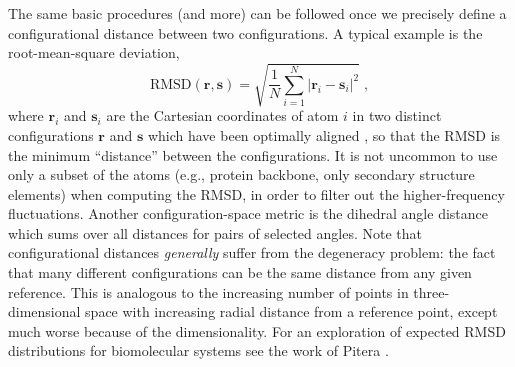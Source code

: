 The same basic procedures (and more) can be followed once we precisely define a configurational distance between two configurations.  A typical example is the root-mean-square deviation,
\begin{equation}
\label{eq:rmsd}
\mathrm{RMSD}(\mathbf{r}, \mathbf{s}) = \sqrt{\frac{1}{N}\sum_{i=1}^{N} \left| \mathbf{r}_i - \mathbf{s}_i \right|^2} \;,
\end{equation}
where $\mathbf{r}_i$ and $\mathbf{s}_i$ are the Cartesian coordinates of atom $i$ in two distinct configurations $\mathbf{r}$ and $\mathbf{s}$ which have been optimally aligned \cite{Kabsch1976}, so that the RMSD is the minimum ``distance'' between the configurations. 
It is not uncommon to use only a subset of the atoms (e.g., protein backbone, only secondary structure elements) when computing the RMSD, in order to filter out the higher-frequency fluctuations.
Another configuration-space metric is the dihedral angle distance which sums over all distances for pairs of selected angles.
Note that configurational distances \emph{generally} suffer from the degeneracy problem: the fact that many different configurations can be the same distance from any given reference.  This is analogous to
the increasing number of points in three-dimensional space
with increasing radial distance from a reference point, except
much worse because of the dimensionality.  For an
exploration of expected RMSD distributions for biomolecular
systems see the work of Pitera \cite{Pitera2014}.


